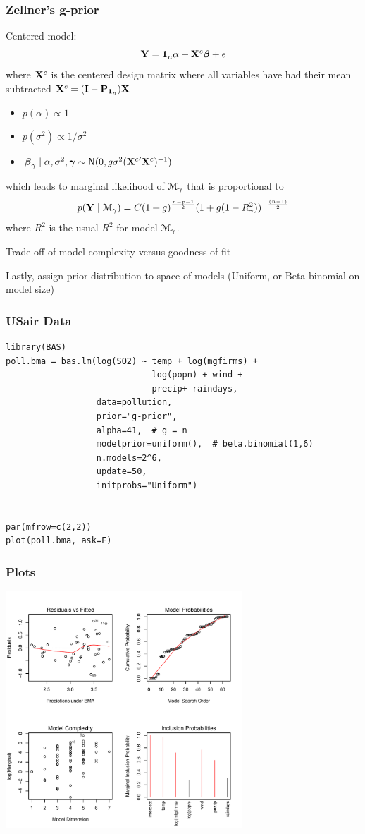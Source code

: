 \documentclass[handout]{beamer}
\begin{document}
\begin{frame}\frametitle{Zellner's g-prior}
  Centered model:  $$\mathbf{Y} = \mathbf{1}_n \alpha + \mathbf{X}^c \boldsymbol{\beta} + \epsilon$$  
  where $\mathbf{X}^c$ is the centered design matrix where all variables have
  had their mean subtracted $\mathbf{X}^c = (\mathbf{I} - \mathbf{P}_{\mathbf{1}_n}) \mathbf{X}$ \pause 
\begin{itemize}
\item   $p(\alpha) \propto 1$ \pause 
\item  $p(\sigma^2) \propto 1/\sigma^2$  \pause 
\item  $\boldsymbol{\beta}_\gamma \mid \alpha, \sigma^2, \boldsymbol{\gamma} \sim \textsf{N}(0, g \sigma^2
  ({\mathbf{X}^c}^\prime \mathbf{X}^c)^{-1})$ \pause 
\end{itemize}
which leads to marginal likelihood of ${\cal M}_\gamma$ that is proportional
to $$ p(\mathbf{Y} \mid {\cal M}_\gamma) = C (1 + g)^{\frac{n-p-1}{2}} ( 1 + g (1 -
 R^2_\gamma))^{- \frac{(n-1)}{2}}$$
where $R^2$ is the usual $R^2$ for model ${\cal M}_\gamma$.
\pause 

Trade-off of model complexity versus goodness of fit

\bigskip
Lastly, assign prior distribution to space of models  (Uniform, or
Beta-binomial on model size)
\end{frame}

\begin{frame}[fragile]
\frametitle{USair Data}
\begin{verbatim}
library(BAS)
poll.bma = bas.lm(log(SO2) ~ temp + log(mgfirms) + 
                             log(popn) + wind + 
                             precip+ raindays, 
                  data=pollution, 
                  prior="g-prior", 
                  alpha=41,  # g = n
                  modelprior=uniform(),  # beta.binomial(1,6)
                  n.models=2^6, 
                  update=50, 
                  initprobs="Uniform")


par(mfrow=c(2,2))
plot(poll.bma, ask=F)
\end{verbatim}
\end{frame}
\begin{frame}\frametitle{Plots} 
  \centering 
  \includegraphics[height=3.5in]{poll-bma-sum}
\end{frame}
\end{document}
